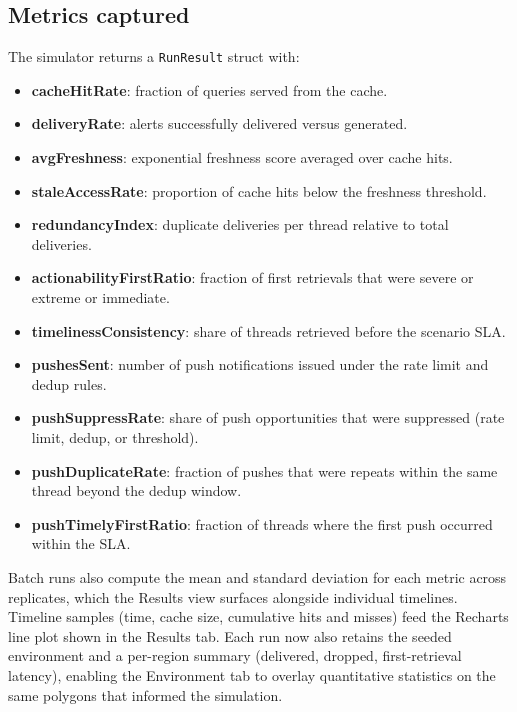 \subsection{Metrics captured}
The simulator returns a \texttt{RunResult} struct with:
\begin{itemize}
    \item \textbf{cacheHitRate}: fraction of queries served from the cache.
    \item \textbf{deliveryRate}: alerts successfully delivered versus generated.
    \item \textbf{avgFreshness}: exponential freshness score averaged over cache hits.
    \item \textbf{staleAccessRate}: proportion of cache hits below the freshness threshold.
    \item \textbf{redundancyIndex}: duplicate deliveries per thread relative to total deliveries.
    \item \textbf{actionabilityFirstRatio}: fraction of first retrievals that were severe or extreme or immediate.
    \item \textbf{timelinessConsistency}: share of threads retrieved before the scenario SLA.
    \item \textbf{pushesSent}: number of push notifications issued under the rate limit and dedup rules.
    \item \textbf{pushSuppressRate}: share of push opportunities that were suppressed (rate limit, dedup, or threshold).
    \item \textbf{pushDuplicateRate}: fraction of pushes that were repeats within the same thread beyond the dedup window.
    \item \textbf{pushTimelyFirstRatio}: fraction of threads where the first push occurred within the SLA.
\end{itemize}
Batch runs also compute the mean and standard deviation for each metric across replicates, which the Results view surfaces alongside individual timelines. Timeline samples (time, cache size, cumulative hits and misses) feed the Recharts line plot shown in the Results tab. Each run now also retains the seeded environment and a per-region summary (delivered, dropped, first-retrieval latency), enabling the Environment tab to overlay quantitative statistics on the same polygons that informed the simulation.

